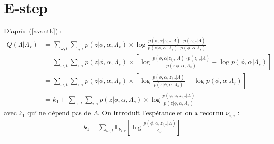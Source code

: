 \documentclass[a4paper,12pt]{article}
\begin{document}
\section{E-step}
D'après (\ref{avantk}) :
\begin{align}
Q(\Lambda|\Lambda_s) & = \displaystyle\sum_{\omega,t} \displaystyle\sum_{i, \tau} p(z|\phi,\alpha,\Lambda_s) \times \log \frac{p(\phi, \alpha | z_{i, \tau}, \Lambda) \cdot p(z_{i, \tau} | \Lambda)}{p(z|\phi,\alpha,\Lambda_s) \cdot p(\phi, \alpha | \Lambda_s)} \nonumber \\
& = \displaystyle\sum_{\omega,t} \displaystyle\sum_{i, \tau} p(z|\phi,\alpha,\Lambda_s) \times [ \log \frac{p(\phi, \alpha | z_{i, \tau}, \Lambda) \cdot p(z_{i, \tau} | \Lambda)}{p(z|\phi,\alpha,\Lambda_s)}  - \log p(\phi, \alpha | \Lambda_s) ] \nonumber \\
& = \displaystyle\sum_{\omega,t} \displaystyle\sum_{i, \tau} p(z|\phi,\alpha,\Lambda_s) \times [ \log \frac{p(\phi, \alpha, z_{i, \tau} | \Lambda)}{p(z|\phi,\alpha,\Lambda_s)}  - \log p(\phi, \alpha | \Lambda_s) ] \nonumber \\
& = k_1 + \displaystyle\sum_{\omega,t} \displaystyle\sum_{i, \tau} p(z|\phi,\alpha,\Lambda_s) \times \log \frac{p(\phi, \alpha, z_{i, \tau} | \Lambda)}{p(z|\phi,\alpha,\Lambda_s)} \nonumber
\end{align}
avec $k_1$ qui ne dépend pas de $\Lambda$. On introduit l'espérance et on a reconnu $\nu_{i,\tau}$ :
\begin{align*}
& k_1 + \displaystyle\sum_{\omega,t} \mathbb{E}_{\nu_{i,\tau}} [ \log \frac{p(\phi, \alpha, z_{i, \tau} | \Lambda)}{\nu_{i,\tau}}] \\
= &
\end{align*}
\end{document}
